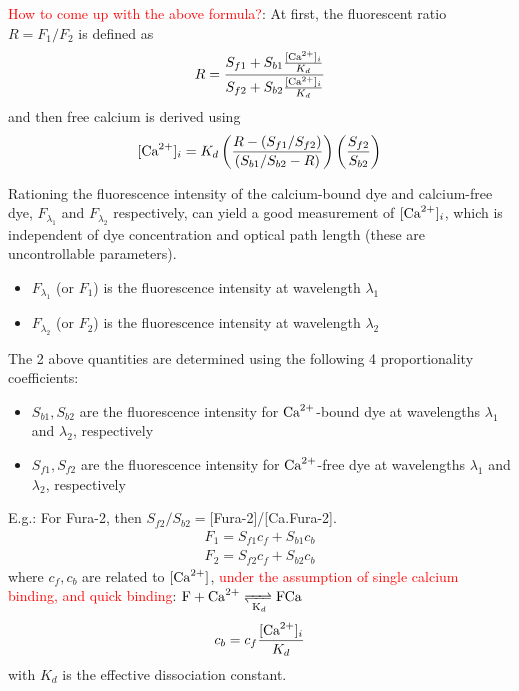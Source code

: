 \textcolor{red}{How to come up with the above formula?}: At first, the
fluorescent ratio $R=F_1/F_2$ is defined as 
\begin{equation}
  \label{eq:1288}
  R = \frac{S_{f1}+S_{b1}\frac{[{\text{Ca}^{2+}}]_i}{K_d}}{S_{f2}+S_{b2}\frac{[{\text{Ca}^{2+}}]_i}{K_d}}
\end{equation}
and then free calcium is derived using
\begin{equation}
  \label{eq:1289}
  [{\text{Ca}^{2+}}]_i = K_d\left(\frac{R-(S_{f1}/S_{f2})}{(S_{b1}/S_{b2}-R)}\right)\left(\frac{S_{f2}}{S_{b2}}\right)
\end{equation}

Rationing the fluorescence intensity of the calcium-bound dye and calcium-free
dye, $F_{\lambda_1}$ and $F_{\lambda_2}$ respectively, can yield a good
measurement of $[{\text{Ca}^{2+}}]_i$, which is independent of dye concentration and optical
path length (these are uncontrollable parameters).
\begin{itemize}
\item $F_{\lambda_1}$ (or $F_1$) is the fluorescence intensity at wavelength
  $\lambda_1$
\item $F_{\lambda_2}$ (or $F_2$) is the fluorescence intensity at wavelength
  $\lambda_2$
\end{itemize}
The 2 above quantities are determined using the following 4 proportionality
coefficients:
\begin{itemize}
\item $S_{b1}, S_{b2}$ are the fluorescence intensity for ${\text{Ca}^{2+}}$-bound dye at
wavelengths $\lambda_1$ and $\lambda_2$, respectively
\item $S_{f1}, S_{f2}$ are the fluorescence intensity for ${\text{Ca}^{2+}}$-free dye at
wavelengths $\lambda_1$ and $\lambda_2$, respectively
\end{itemize}
E.g.: For Fura-2, then $S_{f2}/S_{b2}=$[Fura-2]/[Ca.Fura-2].
\begin{equation}
  \label{eq:1286}
\begin{split}
F_1 = S_{f1}c_f + S_{b1}c_b \\
F_2 = S_{f2}c_f + S_{b2}c_b
\end{split}
\end{equation}
where $c_f, c_b$ are related to $[{\text{Ca}^{2+}}]$, \textcolor{red}{under the assumption of
single calcium binding, and quick binding}: $\ce{F + Ca^2+ <=>[][K_d] FCa}$
\begin{equation}
  \label{eq:1287}
  c_b = c_f\frac{[{\text{Ca}^{2+}}]_i}{K_d}
\end{equation}
with $K_d$ is the effective dissociation constant.

